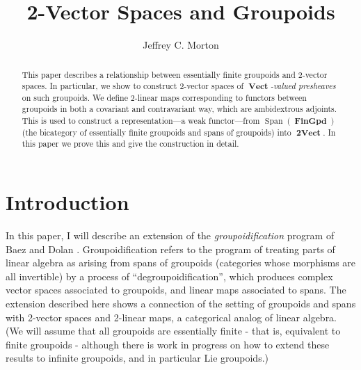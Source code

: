 \documentclass[10pt]{amsart}
\numberwithin{theorem}{subsection}
\newcommand{\opname}[1]{\operatorname{#1}}
\newcommand{\catname}[1]{\boldsymbol{\opname{{#1}}}}
\newcommand{\Span}{\opname{Span}}
\newcommand{\V}{\catname{Vect}}
\newcommand{\iiV}{\catname{2Vect}}
\newcommand{\Gpd}{\catname{FinGpd}}
\begin{document}
\title{2-Vector Spaces and Groupoids}
\author{Jeffrey C. Morton}
\address{Mathematics Department, University of Western Ontario}

\maketitle

\begin{abstract}
This paper describes a relationship between essentially finite
groupoids and 2-vector spaces.  In particular, we show to construct
2-vector spaces of \textit{$\V$-valued presheaves} on such groupoids.
We define 2-linear maps corresponding to functors between groupoids in
both a covariant and contravariant way, which are ambidextrous
adjoints.  This is used to construct a representation---a weak
functor---from $\Span(\Gpd)$ (the bicategory of essentially finite groupoids and spans of
groupoids) into $\iiV$.  In this paper we prove this and give the
construction in detail.
\end{abstract}

\maketitle

\section{Introduction}\label{sec:intro}

In this paper, I will describe an extension of the
\textit{groupoidification} program of Baez and Dolan \cite{hdaVII}.
Groupoidification refers to the program of treating parts of linear
algebra as arising from spans of groupoids (categories whose morphisms
are all invertible) by a process of ``degroupoidification'', which
produces complex vector spaces associated to groupoids, and linear
maps associated to spans.  The extension described here shows a
connection of the setting of groupoids and spans with 2-vector spaces
and 2-linear maps, a categorical analog of linear algebra.  (We will
assume that all groupoids are essentially finite - that is, equivalent
to finite groupoids - although there is work in progress on how to
extend these results to infinite groupoids, and in particular Lie
groupoids.)
\end{document}
